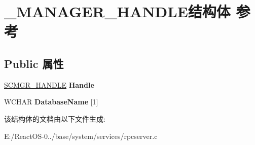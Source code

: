 \hypertarget{struct___m_a_n_a_g_e_r___h_a_n_d_l_e}{}\section{\+\_\+\+M\+A\+N\+A\+G\+E\+R\+\_\+\+H\+A\+N\+D\+L\+E结构体 参考}
\label{struct___m_a_n_a_g_e_r___h_a_n_d_l_e}
\subsection*{Public 属性}
\begin{DoxyCompactItemize}
\item 
\mbox{\label{struct___m_a_n_a_g_e_r___h_a_n_d_l_e_a016fcc27163c49b6e775cc6c038644aa}} 
\hyperlink{struct___s_c_m_g_r___h_a_n_d_l_e}{S\+C\+M\+G\+R\+\_\+\+H\+A\+N\+D\+LE} {\bfseries Handle}
\item 
\mbox{\label{struct___m_a_n_a_g_e_r___h_a_n_d_l_e_a2fdd0d0b05cbc42c4f7bef9441a5e646}} 
W\+C\+H\+AR {\bfseries Database\+Name} \mbox{[}1\mbox{]}
\end{DoxyCompactItemize}


该结构体的文档由以下文件生成\+:\begin{DoxyCompactItemize}
\item 
E\+:/\+React\+O\+S-\/0../base/system/services/rpcserver.\+c\end{DoxyCompactItemize}
